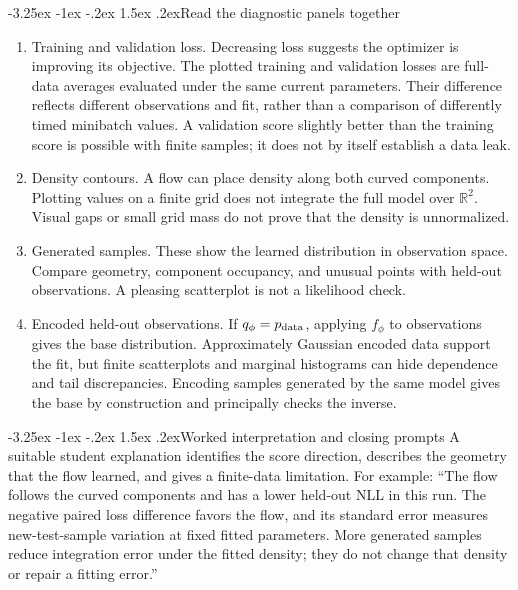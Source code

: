 \documentclass[11pt,a4paper]{article}
\makeatletter
\newcommand{\R}{\mathbb R}
\renewcommand\subsection{\@startsection{subsection}{2}{\z@}%
  {-3.25ex \@plus -1ex \@minus -.2ex}%
  {1.5ex \@plus .2ex}{\normalfont\large}}
\makeatother
\begin{document}
\subsection{Read the diagnostic panels together}
\begin{enumerate}
\item Training and validation loss. Decreasing loss suggests the
optimizer is improving its objective. The plotted training and validation
losses are full-data averages evaluated under the same current parameters.
Their difference reflects different observations and fit, rather than a
comparison of differently timed minibatch values. A validation score slightly
better than the training score is possible with finite samples; it does not
by itself establish a data leak.
\item Density contours. A flow can place density along both curved
components. Plotting values on a finite grid does not integrate the full
model over $\R^2$. Visual gaps or small grid mass do not prove that the
density is unnormalized.
\item Generated samples. These show the learned distribution in
observation space. Compare geometry, component occupancy, and unusual points
with held-out observations. A pleasing scatterplot is not a likelihood check.
\item Encoded held-out observations. If $q_\phi=p_{\rm data}$, applying
$f_\phi$ to observations gives the base distribution. Approximately Gaussian
encoded data support the fit, but finite scatterplots and marginal histograms
can hide dependence and tail discrepancies. Encoding samples generated by the
same model gives the base by construction and principally checks the inverse.
\end{enumerate}

\subsection{Worked interpretation and closing prompts}
A suitable student explanation identifies the score direction, describes the
geometry that the flow learned, and gives a finite-data limitation. For example:
``The flow follows the curved components and has a lower held-out NLL in this
run. The negative paired loss difference favors the flow, and its standard
error measures new-test-sample variation at fixed fitted parameters. More
generated samples reduce integration error under the fitted density; they
do not change that density or repair a fitting error.''
\end{document}

